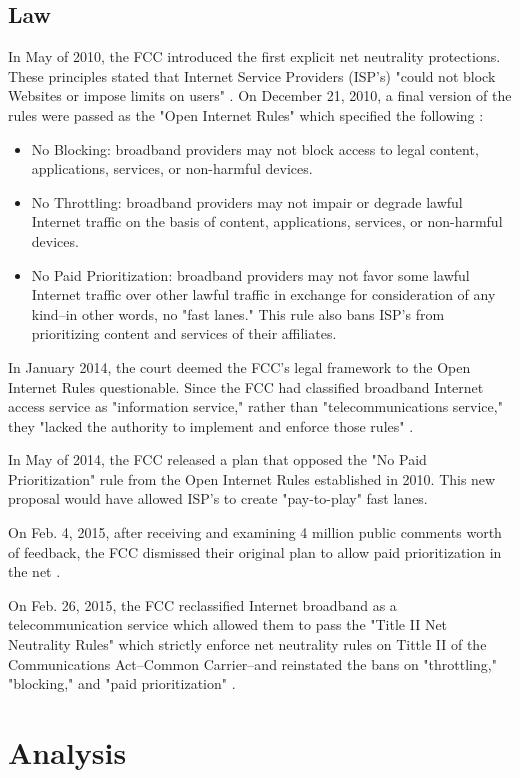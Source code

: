 \documentclass[11pt]{article}
\begin{document}
\subsection{Law}
In May of 2010, the FCC introduced the first explicit net neutrality protections.  These principles stated that Internet Service Providers (ISP's) "could not block Websites or impose limits on users" \cite{WH}.  On December 21, 2010, a final version of the rules were passed as the "Open Internet Rules" which specified the following \cite{FCC}:
\begin{itemize}
\item No Blocking: broadband providers may not block access to legal content, applications, services, or non-harmful devices.
\item No Throttling: broadband providers may not impair or degrade lawful Internet traffic on the basis of content, applications, services, or non-harmful devices.
\item No Paid Prioritization: broadband providers may not favor some lawful Internet traffic over other lawful traffic in exchange for consideration of any kind--in other words, no "fast lanes." This rule also bans ISP's from prioritizing content and services of their affiliates.
\end{itemize}

In January 2014, the court deemed the FCC's legal framework  to the Open Internet Rules questionable.  Since the FCC had classified broadband Internet access service as "information service," rather than "telecommunications service," they "lacked the authority to implement and enforce those rules" \cite{FP}.

In May of 2014, the FCC released a plan that opposed the "No Paid Prioritization" rule from the Open Internet Rules established in 2010.  This new proposal would have allowed ISP's to create "pay-to-play" fast lanes. 

On Feb. 4, 2015, after receiving and examining 4 million public comments worth of feedback, the FCC dismissed their original plan to allow paid prioritization in the net \cite{FP}\cite{WH}.

On Feb. 26, 2015, the FCC reclassified Internet broadband as a telecommunication service which allowed them to pass the "Title II Net Neutrality Rules" which strictly enforce net neutrality rules on Tittle II of the Communications Act--Common Carrier--and reinstated the bans on "throttling," "blocking," and "paid prioritization" \cite{FP}.


\section{Analysis}
\end{document}
